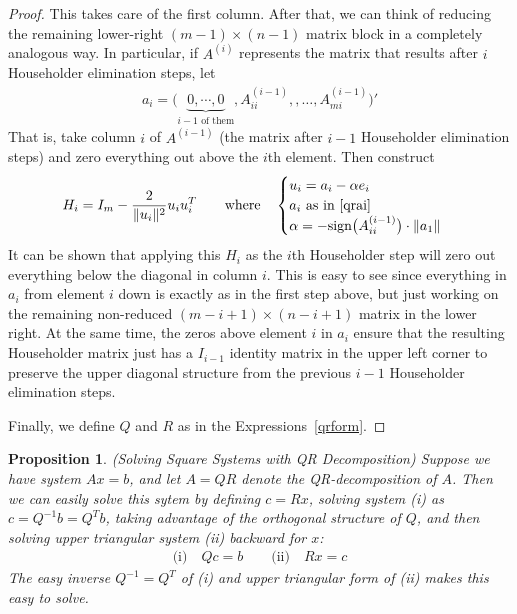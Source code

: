 \documentclass[12pt]{article}
\numberwithin{equation}{section} %
\theoremstyle{plain}
\newtheorem{prop}[thm]{Proposition}
\theoremstyle{definition}
\theoremstyle{remark}
\begin{document}
\begin{proof}
This takes care of the first column. After that, we can think of
reducing the remaining lower-right $(m-1)\times (n-1)$ matrix block in a
completely analogous way. In particular, if $A^{(i)}$ represents the
matrix that results after $i$ Householder elimination steps, let
\begin{align}
  a_i =
  \big(
  \underbrace{0,\cdots, 0}_{\text{$i-1$ of them}},
  A_{ii}^{(i-1)}, ,\ldots,A_{mi}^{(i-1)}
  \big)'
  \label{qrai}
\end{align}
That is, take column $i$ of $A^{(i-1)}$ (the matrix after $i-1$
Householder elimination steps) and zero everything out above the $i$th
element. Then construct
\begin{align*}
  H_i = I_m - \frac{2}{\lVert u_i\lVert^2}u_iu_i^T
  \qquad \text{where}\quad
  \begin{cases}
    u_i = a_i -\alpha e_i \\
    \text{$a_i$ as in \ref{qrai}} \\
    \alpha = -\text{sign}\big(A_{ii}^{(i-1)}\big)\cdot \lVert a_1\rVert
  \end{cases}
\end{align*}
It can be shown that applying this $H_i$ as the $i$th Householder step
will zero out everything below the diagonal in column $i$. This is easy
to see since everything in $a_i$ from element $i$ down is exactly as in
the first step above, but just working on the remaining non-reduced
$(m-i+1)\times (n-i+1)$ matrix in the lower right. At the same time, the
zeros above element $i$ in $a_i$ ensure that the resulting Householder
matrix just has a $I_{i-1}$ identity matrix in the upper left corner to
preserve the upper diagonal structure from the previous $i-1$
Householder elimination steps.

Finally, we define $Q$ and $R$ as in the Expressions~\ref{qrform}.
\end{proof}

\begin{prop}\emph{(Solving Square Systems with QR Decomposition)}
Suppose we have system $Ax=b$, and let $A=QR$ denote the
QR-decomposition of $A$.
Then we can easily solve this sytem by defining $c=Rx$,
solving system (i) as $c=Q^{-1}b=Q^Tb$, taking advantage of the
orthogonal structure of $Q$, and then solving upper triangular system
(ii) backward for $x$:
\begin{align*}
  \text{(i)}\quad
  Qc = b
  \qquad
  \text{(ii)}\quad
  Rx = c
\end{align*}
The easy inverse $Q^{-1}=Q^T$ of (i) and upper triangular form of (ii)
makes this easy to solve.
\end{prop}
\end{document}

